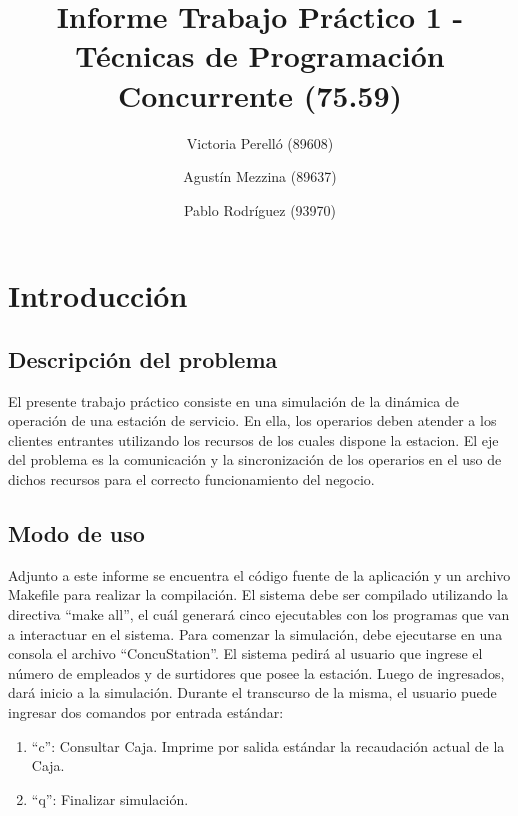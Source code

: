 \documentclass{article}
\begin{document}
\title{Informe Trabajo Práctico 1 - Técnicas de Programación Concurrente (75.59)}
\author{Victoria Perelló (89608)\\
        \and
        Agustín Mezzina (89637)\\
	\and
        Pablo Rodríguez (93970)}
\maketitle

\tableofcontents
\clearpage

\section{Introducción}
\subsection{Descripción del problema}
El presente trabajo práctico consiste en una simulación de la dinámica de operación de una estación de servicio. En ella, los operarios deben atender a los clientes entrantes utilizando los recursos de los cuales dispone la estacion. El eje del problema es la comunicación y la sincronización de los operarios en el uso de dichos recursos para el correcto funcionamiento del negocio.
\subsection{Modo de uso}
Adjunto a este informe se encuentra el código fuente de la aplicación y un archivo Makefile para realizar la compilación. El sistema debe ser compilado utilizando la directiva ``make all'', el cuál generará cinco ejecutables con los programas que van a interactuar en el sistema.
Para comenzar la simulación, debe ejecutarse en una consola el archivo ``ConcuStation''.
El sistema pedirá al usuario que ingrese el número de empleados y de surtidores que posee la estación. Luego de ingresados, dará inicio a la simulación.
Durante el transcurso de la misma, el usuario puede ingresar dos comandos por entrada estándar:
\begin{enumerate}
	\item ``c'': Consultar Caja. Imprime por salida estándar la recaudación actual de la Caja.
	\item ``q'': Finalizar simulación.
\end{enumerate}
\end{document}
